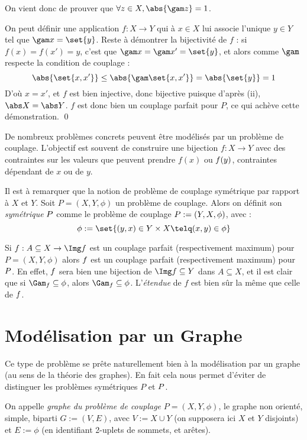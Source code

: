     On vient donc de prouver que $\forall z \in X, \abs{\gam z} = 1$.
    
    On peut définir une application $f : X \to Y$ qui à $x \in X$ lui associe l'unique $y \in Y$ tel que $\gam x = \set{y}$. Reste à démontrer la bijectivité de $f$ : si $f(x) = f(x') = y$, c'est que $\gam x = \gam x' = \set{y}$, et alors comme $\gam$ respecte la condition de couplage :
    \[ \abs{\set{x,x'}} \leq \abs{\gam\set{x, x'}} = \abs{\set{y}} = 1 \]
    D'où $x = x'$, et $f$ est bien injective, donc bijective puisque d'après (ii), $\abs X = \abs Y$. $f$ est donc bien un couplage parfait pour $P$, ce qui achève cette démonstration.
 \qed\SEP
 
 De nombreux problèmes concrets peuvent être modélisés par un problème de couplage. L'objectif est souvent de construire une bijection $f : X \to Y$ avec des contraintes sur les valeurs que peuvent prendre $f(x)$ ou $f\-(y)$, contraintes dépendant de $x$ ou de $y$.
 
 Il est à remarquer que la notion de problème de couplage symétrique par rapport à $X$ et $Y$.
 \SEP\jdefi
    Soit $P = (X,Y,\phi)$ un problème de couplage. Alors on définit son \emph{symétrique} $P\-$ comme le problème de couplage $P\- := (Y,X,\phi\-)$, avec :
    \[\phi\- := \set{ (y,x) \in Y \times X \telq (x,y) \in \phi } \]
 \SEP
 
 Si $f : A \subseteq X \to \Img f$ est un couplage parfait (respectivement maximum) pour $P = (X,Y,\phi)$ alors $f\-$ est un couplage parfait (respectivement maximum) pour $P\-$. En effet, $f\-$ sera bien une bijection de $\Img f \subseteq Y$ dans $A \subseteq X$, et il est clair que si $\Gam_f \subseteq \phi$, alors $\Gam_{f\-} \subseteq \phi\-$. L'\emph{étendue} de $f$ est bien sûr la même que celle de $f\-$.
 
 \section{Modélisation par un Graphe}
 
 Ce type de problème se prête naturellement bien à la modélisation par un graphe (au sens de la théorie des graphes). En fait cela nous permet d'éviter de distinguer les problèmes symétriques $P$ et $P\-$.
 
 \SEP\jdefi On appelle \emph{graphe du problème de couplage} $P = (X,Y,\phi)$, le graphe non orienté, simple, biparti $G := (V, E)$, avec $V := X \cup Y$ (on supposera ici $X$ et $Y$ disjoints) et $E := \phi$ (en identifiant 2-uplets de sommets, et arêtes).
 
